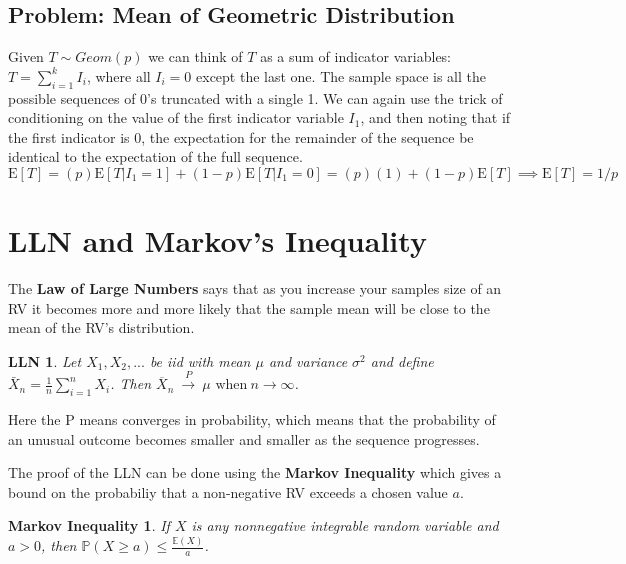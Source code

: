 \subsection{Problem: Mean of Geometric Distribution}
Given $T\sim Geom(p)$ we can think of $T$ as a sum of indicator variables: $T = \sum_{i=1}^k I_i$, where all $I_i=0$ except the last one. The sample space is all the possible sequences of 0's truncated with a single 1. We can again use the trick of conditioning on the value of the first indicator variable $I_1$, and then noting that if the first indicator is 0, the expectation for the remainder of the sequence be identical to the expectation of the full sequence. 
\begin{equation}
\mathrm{E}[T] = (p)\mathrm{E}[T | I_1=1] + (1-p)\mathrm{E}[T | I_1=0] = (p)(1)+(1-p)\mathrm{E}[T] \implies \mathrm{E}[T] = 1/p
\end{equation}




\section{LLN and Markov's Inequality}
The \textbf{Law of Large Numbers} says that as you increase your samples size of an RV it becomes more and more likely that the sample mean will be close to the mean of the RV's distribution.

\theoremstyle{plain}
\newtheorem*{lln}{LLN}
\begin{lln}
Let $X_1, X_2,...$ be iid with mean $\mu$ and variance $\sigma^2$ and define $\bar{X}_n = \frac{1}{n}\sum_{i=1}^nX_i$. Then ${\overline {X}}_{n}\ {\xrightarrow {P}}\ \mu  {\textrm {  when}}\ n\to \infty$. 
\end{lln}
Here the P means converges in probability, which means that the probability of an unusual outcome becomes smaller and smaller as the sequence progresses.
\n

The proof of the LLN can be done using the \textbf{Markov Inequality} which gives a bound on the probabiliy that a non-negative RV exceeds a chosen value $a$. 
\newtheorem*{markov}{Markov Inequality}
\begin{markov}
If $X$ is any nonnegative integrable random variable and $a > 0$, then $\mathbb{P}(X \geq a) \leq \frac{\mathbb{E}(X)}{a}$.
\end{markov}

